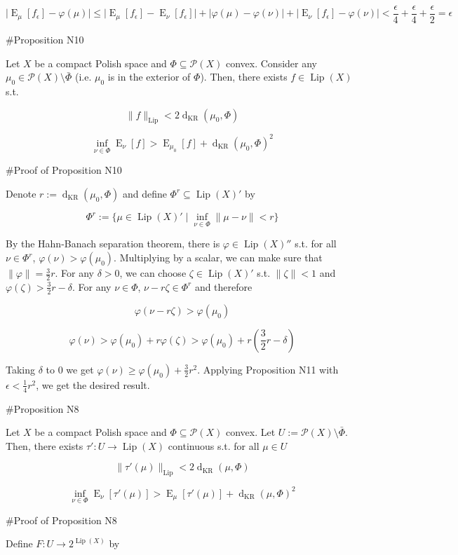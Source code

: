 \documentclass[a4paper]{article}
\DeclareMathOperator{\E}{E}
\newcommand{\Abs}[1]{\lvert #1 \rvert}
\newcommand{\Norm}[1]{\lVert #1 \rVert}
\newcommand{\Prob}{\mathcal{P}}
\newcommand{\Lip}{\operatorname{Lip}}
\newcommand{\NormL}[1]{\Norm{#1}_{\operatorname{Lip}}}
\newcommand{\Dkr}{\operatorname{d}_{\text{KR}}}
\begin{document}
$$\Abs{\E_\mu[f_\epsilon] - \varphi(\mu)} \leq \Abs{\E_\mu[f_\epsilon] - \E_\nu[f_\epsilon]} + \Abs{\varphi(\mu) - \varphi(\nu)} + \Abs{\E_\nu[f_\epsilon] - \varphi(\nu)} < \frac{\epsilon}{4} + \frac{\epsilon}{4} + \frac{\epsilon}{2} = \epsilon$$

\#Proposition N10

Let $X$ be a compact Polish space and $\Phi \subseteq \Prob(X)$ convex. Consider any $\mu_0 \in \Prob(X) \setminus \bar{\Phi}$ (i.e. $\mu_0$ is in the exterior of $\Phi$). Then, there exists $f \in \Lip(X)$ s.t.

$$\NormL{f} < 2\Dkr(\mu_0,\Phi)$$

$$\inf_{\nu \in \Phi} \E_\nu[f] > \E_{\mu_0}[f] + \Dkr(\mu_0,\Phi)^2$$

\#Proof of Proposition N10

Denote $r:=\Dkr(\mu_0,\Phi)$ and define $\Phi^r \subseteq \Lip(X)'$ by

$$\Phi^r:=\{\mu \in \Lip(X)' \mid \inf_{\nu \in \Phi} \Norm{\mu - \nu} < r\}$$

By the Hahn-Banach separation theorem, there is $\varphi \in \Lip(X)''$ s.t. for all $\nu \in \Phi^r$, $\varphi(\nu) > \varphi(\mu_0)$. Multiplying by a scalar, we can make sure that $\Norm{\varphi} = \frac{3}{2}r$. For any $\delta > 0$, we can choose $\zeta \in \Lip(X)'$ s.t. $\Norm{\zeta} < 1$ and $\varphi(\zeta) > \frac{3}{2}r - \delta$.  For any $\nu \in \Phi$, $\nu - r \zeta \in \Phi^r$ and therefore

$$\varphi(\nu - r \zeta) > \varphi(\mu_0)$$

$$\varphi(\nu) > \varphi(\mu_0) + r \varphi(\zeta) > \varphi(\mu_0) + r (\frac{3}{2}r - \delta)$$

Taking $\delta$ to 0 we get $\varphi(\nu) \geq \varphi(\mu_0) + \frac{3}{2} r^2$. Applying Proposition N11 with $\epsilon < \frac{1}{4}r^2$, we get the desired result.

\#Proposition N8

Let $X$ be a compact Polish space and $\Phi \subseteq \Prob(X)$ convex. Let $U := \Prob(X) \setminus \bar{\Phi}$. Then, there exists $\tau': U \rightarrow \Lip(X)$ continuous s.t. for all $\mu \in U$

$$\NormL{\tau'(\mu)} < 2\Dkr(\mu,\Phi)$$

$$\inf_{\nu \in \Phi} \E_\nu[\tau'(\mu)] > \E_\mu[\tau'(\mu)] + \Dkr(\mu,\Phi)^2$$

\#Proof of Proposition N8

Define $F: U \rightarrow 2^{\Lip(X)}$ by
\end{document}
